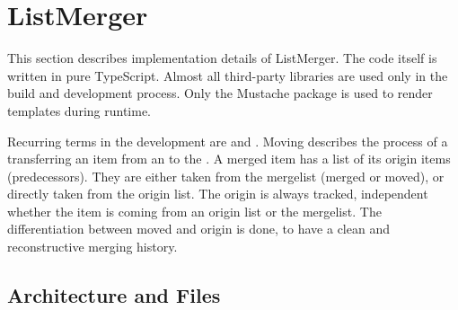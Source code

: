 %
%
% 
% 
% 

\chapter{ListMerger}
\label{chap:listmerger}

This section describes implementation details of ListMerger. The code
itself is written in pure TypeScript. Almost all third-party libraries
are used only in the build and development process. Only the Mustache
package is used to render templates during runtime.

Recurring terms in the development are  and .
Moving describes the process of a transferring an item from an
 to the . A merged item has a list
of its origin items (predecessors). They are either taken from the
mergelist (merged or moved), or directly taken from the origin list. The
origin is always tracked, independent whether the item is coming from an
origin list or the mergelist. The differentiation between moved and
origin is done, to have a clean and reconstructive merging history.


\section{Architecture and Files}

